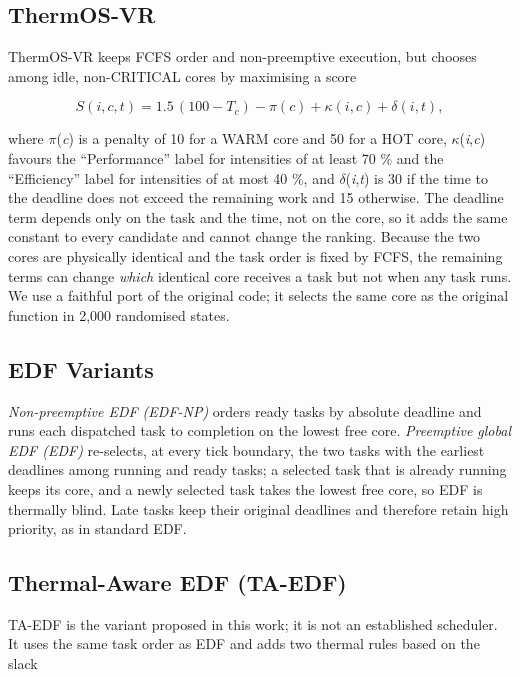 \documentclass[conference]{IEEEtran}
\begin{document}
\subsection{ThermOS-VR}\label{sec:pol-thermos}
ThermOS-VR keeps FCFS order and non-preemptive execution, but chooses among idle, non-CRITICAL cores by maximising a score

\begin{equation}
S(i,c,t) = 1.5\,(100 - T_c) - \pi(c) + \kappa(i,c) + \delta(i,t),
\label{eq:score}
\end{equation}

where $\pi$(\emph{c}) is a penalty of 10 for a WARM core and 50 for a HOT core, $\kappa$(\emph{i},\emph{c}) favours the ``Performance'' label for intensities of at least 70 \% and the ``Efficiency'' label for intensities of at most 40 \%, and $\delta$(\emph{i},\emph{t}) is 30 if the time to the deadline does not exceed the remaining work and 15 otherwise. The deadline term depends only on the task and the time, not on the core, so it adds the same constant to every candidate and cannot change the ranking. Because the two cores are physically identical and the task order is fixed by FCFS, the remaining terms can change \emph{which} identical core receives a task but not when any task runs. We use a faithful port of the original code; it selects the same core as the original function in 2,000 randomised states.

\subsection{EDF Variants}\label{sec:pol-edf}
\emph{Non-preemptive EDF (EDF-NP)} orders ready tasks by absolute deadline and runs each dispatched task to completion on the lowest free core. \emph{Preemptive global EDF (EDF)} re-selects, at every tick boundary, the two tasks with the earliest deadlines among running and ready tasks; a selected task that is already running keeps its core, and a newly selected task takes the lowest free core, so EDF is thermally blind. Late tasks keep their original deadlines and therefore retain high priority, as in standard EDF.

\subsection{Thermal-Aware EDF (TA-EDF)}\label{sec:pol-taedf}
TA-EDF is the variant proposed in this work; it is not an established scheduler. It uses the same task order as EDF and adds two thermal rules based on the slack
\end{document}
